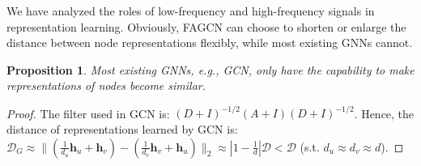 \documentclass[letterpaper]{article} %
\newtheorem{proposition}{Proposition}
\begin{document}
We have analyzed the roles of low-frequency and high-frequency signals in representation learning. Obviously, FAGCN can choose to shorten or enlarge the distance between node representations flexibly, while most existing GNNs cannot.

\begin{proposition}
	Most existing GNNs, e.g., GCN, only have the capability to make representations of nodes become similar.
\end{proposition}

\begin{proof}
	The filter used in GCN is: $(D+I)^{-1/2}(A+I)(D+I)^{-1/2}$. 
	Hence, the distance of representations learned by GCN is: $\mathcal{D}_{G} \approx \| (\frac{1}{d_{u}} \mathbf{h}_{u} + \mathbf{h}_{v}) - (\frac{1}{d_{v}} \mathbf{h}_{v} + \mathbf{h}_{u}) \|_{2} \approx |1-\frac{1}{d}|\mathcal{D} < \mathcal{D}$ (s.t. $d_{u} \approx d_{v} \approx d$).
\end{proof}
	
\end{document}
